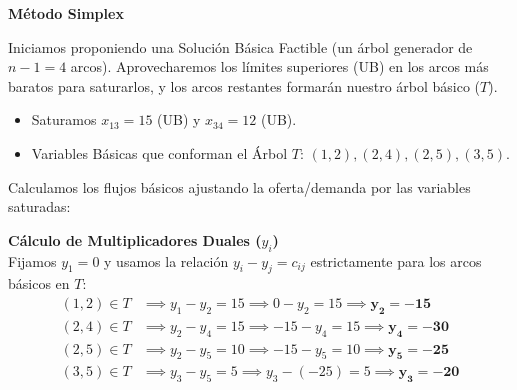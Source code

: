 \documentclass[10pt,a4paper]{article}
\begin{document}
\vspace{0.3cm}
\textbf{Método Simplex}

Iniciamos proponiendo una Solución Básica Factible (un árbol generador de $n-1 = 4$ arcos). Aprovecharemos los límites superiores (UB) en los arcos más baratos para saturarlos, y los arcos restantes formarán nuestro árbol básico ($T$).

\begin{itemize}
    \item Saturamos $x_{13} = 15$ (UB) y $x_{34} = 12$ (UB). 
    \item Variables Básicas que conforman el Árbol $T$: $(1,2), (2,4), (2,5), (3,5)$.
\end{itemize}

Calculamos los flujos básicos ajustando la oferta/demanda por las variables saturadas:

\begin{table}[H]
\centering
{}
\end{table}

\textbf{Cálculo de Multiplicadores Duales ($y_i$)}\\
Fijamos $y_1 = 0$ y usamos la relación $y_i - y_j = c_{ij}$ estrictamente para los arcos básicos en $T$:
\begin{align*}
(1,2) \in T &\implies y_1 - y_2 = 15 \implies 0 - y_2 = 15 \implies \mathbf{y_2 = -15} \\
(2,4) \in T &\implies y_2 - y_4 = 15 \implies -15 - y_4 = 15 \implies \mathbf{y_4 = -30} \\
(2,5) \in T &\implies y_2 - y_5 = 10 \implies -15 - y_5 = 10 \implies \mathbf{y_5 = -25} \\
(3,5) \in T &\implies y_3 - y_5 = 5 \implies y_3 - (-25) = 5 \implies \mathbf{y_3 = -20} 
\end{align*}
\end{document}
